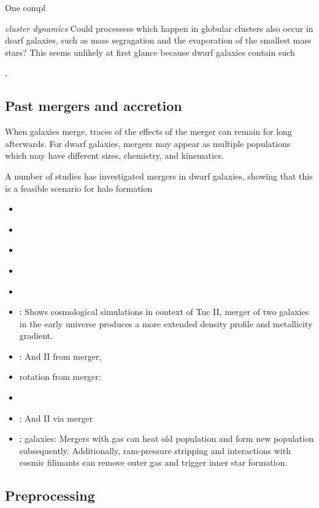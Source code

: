 One compl

\emph{cluster dynamics} Could processess which happen in globular
clusters also occur in dsarf galaxies, such as mass segragation and the
evaporation of the smallest mass stars? This seems unlikely at first
glance because dwarf galaxies contain such

\citet{baumgardt+2022}.

\subsection{Past mergers and
accretion}\label{past-mergers-and-accretion}

When galaxies merge, traces of the effects of the merger can remain for
long afterwards. For dwarf galaxies, mergers may appear as multiple
populations which may have different sizes, chemistry, and kinematics.

A number of studies has investigated mergers in dwarf galaxies, showing
that this is a feasible scenario for halo formation

\begin{itemize}
\tightlist
\item
  \citet{deason+2014}
\item
  \citet{deason+2022}
\item
  \citet{ricotti+polisensky+cleland2022}
\item
  \citet{querci+2025}
\item
  \citet{amorisco+evans+vandeven2014}
\item
  \citet{tarumi+yoshida+frebel2021}: Shows cosmological simulations in
  context of Tuc II, merger of two galaxies in the early universe
  produces a more extended density profile and metallicity gradient.
\item
  \citet{lokas+2014}: And II from merger,
\item
  rotation from merger: \citet{cardona-barrero+2021}
\item
  \citet{starkenburg+helmi+sales2016}
\item
  \citet{fouquet+2017}: And II via merger
\item
  \citet{genina+2019}: \apostle{} galaxies: Mergers with gas can heat
  old population and form new population subsequently. Additionally,
  ram-pressure stripping and interactions with cosmic filimants can
  remove outer gas and trigger inner star formation.
\end{itemize}

\subsection{Preprocessing}\label{preprocessing}


